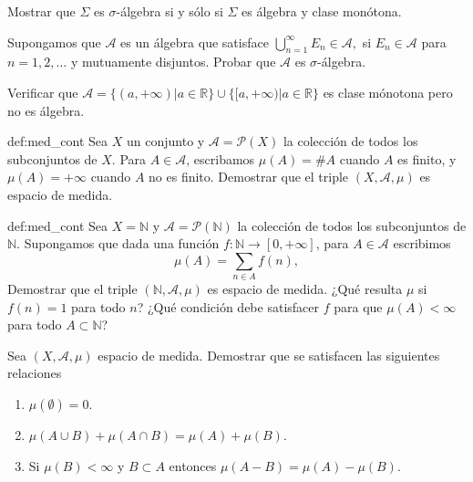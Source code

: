 \documentclass{book}
\newcommand{\rr}{\mathbb{R}}
\begin{document}
\begin{ejer}{}
 Mostrar que  $\Sigma$ es $\sigma$-álgebra si y sólo si $\Sigma$ es álgebra y clase monótona.
\end{ejer}


\begin{ejer}{} Supongamos que $\mathscr{A}$ es un álgebra que  satisface  $\bigcup\limits_{n=1}^{\infty} E_n\in \mathscr{A},$
si $E_n \in \mathscr{A}$ para $ n=1,2,\ldots$ y  mutuamente disjuntos. Probar que $\mathscr{A}$ es $\sigma$-álgebra.
 
\end{ejer}
	
 

\begin{ejer}{}
 Verificar que $\mathscr{A}=\{(a,+\infty)|a \in \rr\}\cup \{[a,+\infty)|a \in \rr\}$ es clase mónotona pero no 
es álgebra.
\end{ejer}


\begin{ejer}{def:med_cont} Sea $X$  un conjunto y $\mathscr{A}=\mathcal{P}(X)$ la colección de todos los subconjuntos de $X$. Para $A\in\mathscr{A}$, escribamos $\mu(A)=\#A$ cuando $A$ es finito, y $\mu(A)=+\infty$ cuando $A$ no es finito. Demostrar que el triple $(X,\mathscr{A},\mu)$ es espacio de medida.
 
\end{ejer}
 
 
\begin{ejer}{def:med_cont} Sea $X=\mathbb{N}$  y $\mathscr{A}=\mathcal{P}(\mathbb{N})$ la colección de todos los subconjuntos de $\mathbb{N}$. Supongamos que dada una función $f:\mathbb{N}\to [0,+\infty]$, para $A\in\mathscr{A}$ escribimos 
\[\mu(A)=\sum_{n\in A}f(n), \] 
Demostrar que el triple $(\mathbb{N},\mathscr{A},\mu)$ es espacio de medida. ¿Qué resulta $\mu$ si $f(n)=1$ para todo $n$? ¿Qué condición debe satisfacer $f$ para que $\mu(A)<\infty$ para todo $A\subset\mathbb{N}$?
 
\end{ejer}

\begin{ejer}{}  Sea $(X,\mathscr{A},\mu)$ espacio de medida. Demostrar que se satisfacen las siguientes relaciones
\begin{enumerate}
 \item $\mu(\emptyset)=0$.
 \item $\mu(A\cup B)+\mu(A\cap B)=\mu(A)+\mu(B)$.
 \item Si $\mu(B)<\infty$ y $B\subset A$ entonces $\mu(A-B)=\mu(A)-\mu(B)$. 
\end{enumerate}
\end{ejer}
\end{document}
